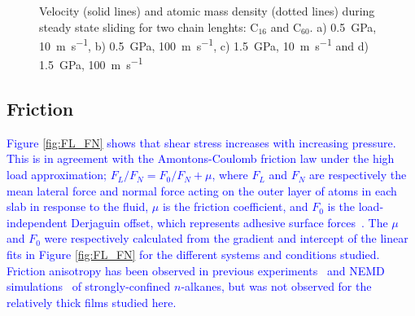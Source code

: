 \documentclass[5p]{elsarticle}
\begin{document}
\begin{figure}[htp]
\begin{center}
		\caption{Velocity (solid lines) and atomic mass density (dotted lines) during steady state sliding for two chain lenghts: C$_{16}$ and C$_{60}$. a) \SI{0.5}{\giga\pascal},  \SI{10}{\meter\per\second},   b) \SI{0.5}{\giga\pascal},  \SI{100}{\meter\per\second}, c) \SI{1.5}{\giga\pascal},  \SI{10}{\meter\per\second} and    d) \SI{1.5}{\giga\pascal},  \SI{100}{\meter\per\second}} 
		\label{fig:VelProf_MDP2}
	\end{center}
 \end{figure}

\subsection{Friction}
\label{fri}

\textcolor{blue}{Figure \ref{fig:FL_FN} shows that shear stress increases with increasing pressure. This is in agreement with the Amontons-Coulomb friction law under the high load approximation; $F_L/F_N = F_0/F_N + \mu$, where $F_L$ and $F_N$ are respectively the mean lateral force and normal force acting on the outer layer of atoms in each slab in response to the fluid, $\mu$ is the friction coefficient, and $F_0$ is the load-independent Derjaguin offset, which represents adhesive surface forces~\cite{Eder2013,Ewen2017}. The $\mu$ and $F_0$ were respectively calculated from the gradient and intercept of the linear fits in Figure \ref{fig:FL_FN} for the different systems and conditions studied. Friction anisotropy has been observed in previous experiments~\cite{Kristiansen2012} and NEMD simulations~\cite{Jabbarzadeh2016} of strongly-confined $n$-alkanes, but was not observed for the relatively thick films studied here.}
\end{document}
